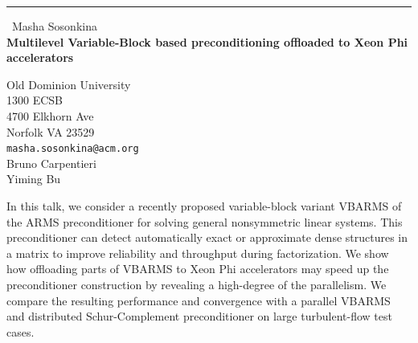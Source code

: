 \documentclass{report}
\begin{document}
\begin{center}
\rule{6in}{1pt} \
{\large Masha Sosonkina \\
{\bf Multilevel Variable-Block based preconditioning offloaded to Xeon Phi accelerators}}

Old Dominion University \\ 1300 ECSB \\ 4700 Elkhorn Ave \\ Norfolk VA 23529
\\
{\tt masha.sosonkina@acm.org}\\
Bruno Carpentieri\\
Yiming Bu\end{center}

In this talk, we consider a recently proposed variable-block variant
VBARMS of the ARMS preconditioner for solving general nonsymmetric linear
systems. This preconditioner can detect automatically exact or
approximate dense structures in a matrix to improve reliability and
throughput during factorization. We show how offloading parts of VBARMS
to Xeon Phi
accelerators may speed up the preconditioner construction by revealing a
high-degree of the parallelism. We compare the resulting performance and
convergence with a parallel VBARMS and distributed Schur-Complement
preconditioner on large turbulent-flow test cases.
\end{document}

